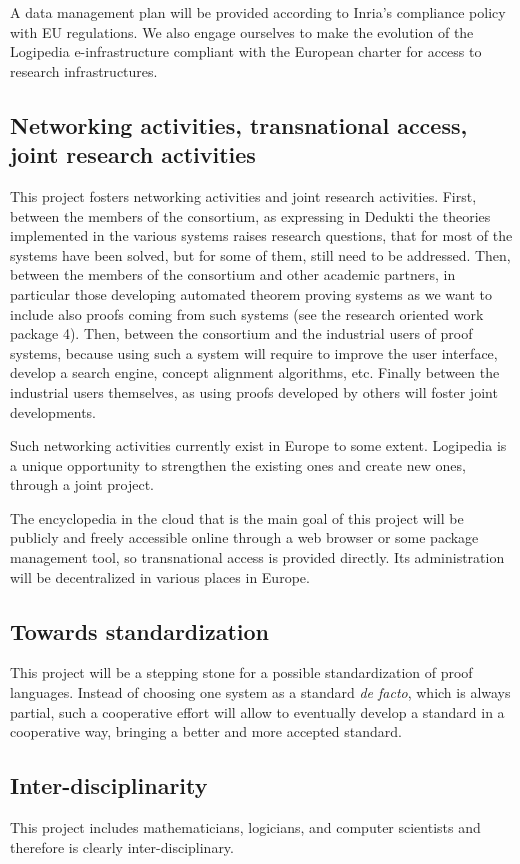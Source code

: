 A data management plan will be provided according to Inria’s
compliance policy with EU regulations. We also engage ourselves to
make the evolution of the {\sc Logipedia} e-infrastructure compliant
with the European charter for access to research infrastructures.

\subsection{Networking activities, transnational access, joint
  research activities}

This project fosters networking activities and joint research
activities. First, between the members of the consortium, as
expressing in {\sc Dedukti} the theories implemented in the various
systems raises research questions, that for most of the systems have
been solved, but for some of them, still need to be addressed.  Then,
between the members of the consortium and other academic partners, in
particular those developing automated theorem proving systems as we
want to include also proofs coming from such systems (see the research
oriented work package 4). Then, between the consortium and the
industrial users of proof systems, because using such a system will
require to improve the user interface, develop a search engine,
concept alignment algorithms, etc.  Finally between the industrial
users themselves, as using proofs developed by others will foster joint
developments.

Such networking activities currently exist in Europe to some extent. {\sc
  Logipedia} is a unique opportunity to strengthen the existing ones and create new ones, through a
joint project.

The encyclopedia in the cloud that is the main goal of this project
will be publicly and freely accessible online through a web browser or some package management tool, so transnational
access is provided directly. Its administration will be decentralized
in various places in Europe.

\subsection{Towards standardization}
This project will be a stepping stone for a possible standardization
of proof languages. Instead of choosing one system as a standard {\em
de facto}, which is always partial, such a cooperative effort will
allow to eventually develop a standard in a cooperative way, bringing
a better and more accepted standard.

\subsection{Inter-disciplinarity}
This project includes mathematicians, logicians, and computer
scientists and therefore is clearly inter-disciplinary.

 











